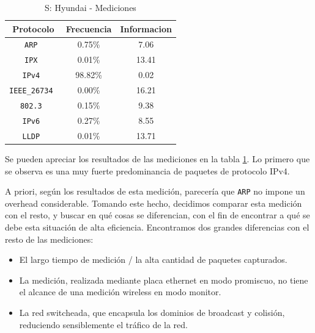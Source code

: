 \documentclass[final,inline,a4paper,narroweqnarray]{ieee}
\begin{document}
    \begin{table}\begin{center}
      \begin{tabular}{|c|c|c|}
      \hline
      \textbf{Protocolo}   & \textbf{Frecuencia} & \textbf{Informacion}\\ \hline
      \texttt{ARP         }& 0.75\%     & 7.06       \\ \hline
      \texttt{IPX         }& 0.01\%     & 13.41      \\ \hline
      \texttt{IPv4        }& 98.82\%    & 0.02       \\ \hline
      \texttt{IEEE\_26734 }& 0.00\%     & 16.21      \\ \hline
      \texttt{802.3       }& 0.15\%     & 9.38       \\ \hline
      \texttt{IPv6        }& 0.27\%     & 8.55       \\ \hline
      \texttt{LLDP        }& 0.01\%     & 13.71      \\ \hline
      \end{tabular}
      \caption{S: Hyundai - Mediciones}
      \label{hyundai-s-table}
    \end{center}\end{table}

    Se pueden apreciar los resultados de las mediciones en la tabla
    \ref{hyundai-s-table}. Lo primero que se observa es una muy fuerte
    predominancia de paquetes de protocolo IPv4.

    A priori, según los resultados de esta medición, parecería que
    \texttt{ARP} no impone un overhead considerable. Tomando este
    hecho, decidimos comparar esta medición con el resto, y buscar en
    qué cosas se diferencian, con el fin de encontrar a qué se debe
    esta situación de alta eficiencia. Encontramos dos grandes
    diferencias con el resto de las mediciones:

    \begin{itemize}

    \item El largo tiempo de medición / la alta cantidad de paquetes
    capturados.

    \item La medición, realizada mediante placa ethernet en modo
    promiscuo, no tiene el alcance de una medición wireless en modo
    monitor.

    \item La red switcheada, que encapsula los dominios de broadcast y
    colisión, reduciendo sensiblemente el tráfico de la red.

    \end{itemize}
\end{document}
